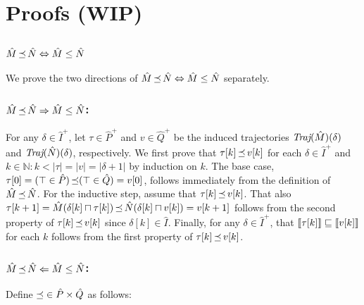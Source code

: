 \section{Proofs (WIP)}

\subsection{$\hat M \operatorname{\mathrel{\preceq}} \hat N \Leftrightarrow \hat M \leq \hat N$}

We prove the two directions of $\hat M \operatorname{\mathrel{\preceq}} \hat N \Leftrightarrow \hat M \leq \hat N$ separately.

\subsubsection{$\hat M \operatorname{\mathrel{\preceq}} \hat N \Rightarrow \hat M \leq \hat N$:} For any $\delta \in \hat I^{+}$, let $\tau \in \hat P^{+}$ and $v \in \hat Q^{+}$ be the induced trajectories $\textit{Traj}(\hat M)(\delta)$ and $\textit{Traj}(\hat N)(\delta)$, respectively. We first prove that $\tau[k] \operatorname{\mathrel{\preceq}} v[k]$ for each $\delta \in \hat I^{+}$ and $k \in \mathbb{N} : k < | \tau | = | v | = | \delta + 1 |$ by induction on $k$. The base case, $\tau[0] = (\top \in \hat P) \operatorname{\mathrel{\preceq}} (\top \in \hat Q) = v[0]$, follows immediately from the definition of $\hat M \operatorname{\mathrel{\preceq}} \hat N$. For the inductive step, assume that $\tau[k] \operatorname{\mathrel{\preceq}} v[k]$. That also $\tau[k+1] = \hat M(\delta[k] \sqcap \tau[k]) \operatorname{\mathrel{\preceq}} \hat N(\delta[k] \sqcap v[k]) = v[k+1]$ follows from the second property of $\tau[k] \operatorname{\mathrel{\preceq}} v[k]$ since $\delta[k] \in \hat I$. Finally, for any $\delta \in \hat I^{+}$, that $\llbracket\tau[k]\rrbracket \sqsubseteq \llbracket v[k]\rrbracket$ for each $k$ follows from the first property of $\tau[k] \operatorname{\mathrel{\preceq}} v[k]$.


\subsubsection{$\hat M \operatorname{\mathrel{\preceq}} \hat N \Leftarrow \hat M \leq \hat N$:} Define $\operatorname{\mathrel{\preceq}} \in \hat P \times \hat Q$ as follows:

